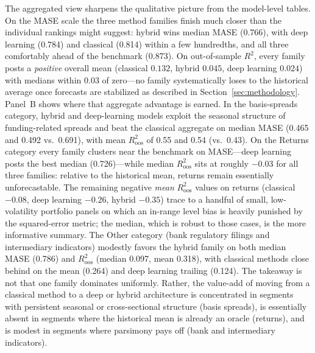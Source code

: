 \documentclass{article}
\newcommand{\floatsource}[1]{\caption*{\footnotesize\emph{#1}}}
\newcommand{\allsources}{Sources: Bloomberg, Board of Governors of the Federal Reserve System, Center for Research in Security Prices, Compustat, Call Reports, FINRA TRACE, OptionMetrics, S\&P Global, Open Source Bond Asset Pricing, He, Kelly, and Manela (2017), Authors' analysis}
\begin{document}
\begin{table}[htbp]
\centering
\caption{Model Performance by Forecasting Method Type}
\label{tab:model_summary_by_type}

\caption*{\footnotesize \textbf{Note:} Each row aggregates every (model $\times$ dataset) observation whose model belongs to the indicated method type. ``\# Models'' counts distinct models in the type and ``N'' counts (model $\times$ dataset) observations. The Historic Average benchmark is reported in its own row because it is the benchmark against which $R^2_{\text{oos}}$ is defined. Lower MASE indicates better performance; higher $R^2_{\text{oos}}$ indicates better performance. Best values within each panel (or, in Panel~B, within each dataset category) are bolded.}
\floatsource{\allsources}
\end{table}

The aggregated view sharpens the qualitative picture from the model-level tables. On the MASE scale the three method families finish much closer than the individual rankings might suggest: hybrid wins median MASE (0.766), with deep learning (0.784) and classical (0.814) within a few hundredths, and all three comfortably ahead of the benchmark (0.873). On out-of-sample $R^2$, every family posts a \emph{positive} overall mean (classical $0.132$, hybrid $0.045$, deep learning $0.024$) with medians within $0.03$ of zero---no family systematically loses to the historical average once forecasts are stabilized as described in Section~\ref{sec:methodology}. Panel~B shows where that aggregate advantage is earned. In the basis-spreads category, hybrid and deep-learning models exploit the seasonal structure of funding-related spreads and beat the classical aggregate on median MASE (0.465 and 0.492 vs.\ 0.691), with mean $R^2_{\text{oos}}$ of 0.55 and 0.54 (vs.\ 0.43). On the Returns category every family clusters near the benchmark on MASE---deep learning posts the best median (0.726)---while median $R^2_{\text{oos}}$ sits at roughly $-0.03$ for all three families: relative to the historical mean, returns remain essentially unforecastable. The remaining negative \emph{mean} $R^2_{\text{oos}}$ values on returns (classical $-0.08$, deep learning $-0.26$, hybrid $-0.35$) trace to a handful of small, low-volatility portfolio panels on which an in-range level bias is heavily punished by the squared-error metric; the median, which is robust to those cases, is the more informative summary. The Other category (bank regulatory filings and intermediary indicators) modestly favors the hybrid family on both median MASE (0.786) and $R^2_{\text{oos}}$ (median 0.097, mean 0.318), with classical methods close behind on the mean (0.264) and deep learning trailing (0.124). The takeaway is not that one family dominates uniformly. Rather, the value-add of moving from a classical method to a deep or hybrid architecture is concentrated in segments with persistent seasonal or cross-sectional structure (basis spreads), is essentially absent in segments where the historical mean is already an oracle (returns), and is modest in segments where parsimony pays off (bank and intermediary indicators).
\end{document}

